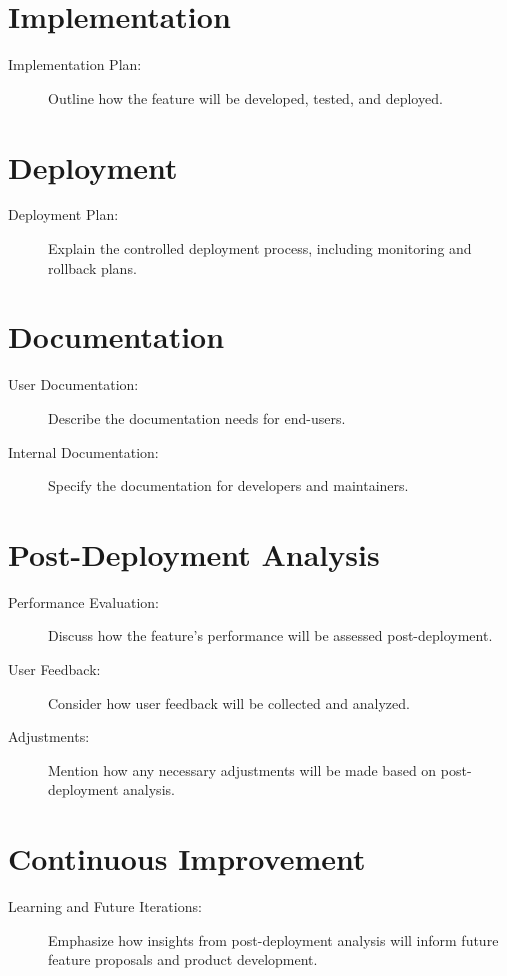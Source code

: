 \documentclass{article}
\begin{document}
\section{Implementation}
\begin{description}
    \item[Implementation Plan:] Outline how the feature will be developed, tested, and deployed.
\end{description}

\section{Deployment}
\begin{description}
    \item[Deployment Plan:] Explain the controlled deployment process, including monitoring and rollback plans.
\end{description}

\section{Documentation}
\begin{description}
    \item[User Documentation:] Describe the documentation needs for end-users.
    \item[Internal Documentation:] Specify the documentation for developers and maintainers.
\end{description}

\section{Post-Deployment Analysis}
\begin{description}
    \item[Performance Evaluation:] Discuss how the feature's performance will be assessed post-deployment.
    \item[User Feedback:] Consider how user feedback will be collected and analyzed.
    \item[Adjustments:] Mention how any necessary adjustments will be made based on post-deployment analysis.
\end{description}

\section{Continuous Improvement}
\begin{description}
    \item[Learning and Future Iterations:] Emphasize how insights from post-deployment analysis will inform future feature proposals and product development.
\end{description}

\vspace*{\fill}
\hrulefill
\vspace*{\fill}

\newpage 

\tableofcontents
{}

\listoftables
\listoffigures
\end{document}

